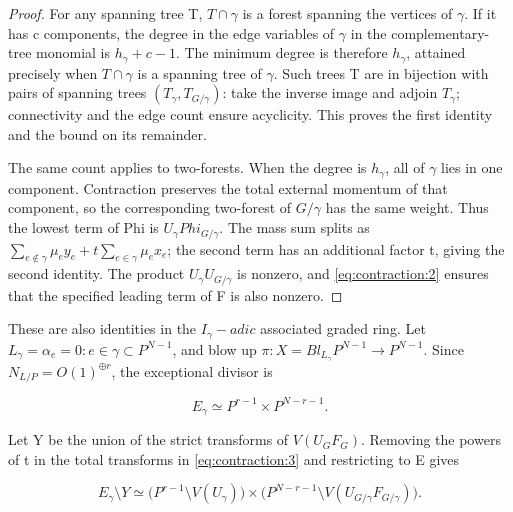 \documentclass[11pt,a4paper,oneside]{article}
\theoremstyle{plain}
\theoremstyle{definition}
\theoremstyle{remark}
\numberwithin{equation}{section}
\begin{document}
\begin{proof}

For any spanning tree T, \(T\cap \gamma \) is a forest spanning the vertices of \(\gamma \). If it has c components, the degree in the edge variables of \(\gamma \) in the complementary-tree monomial is \(h_\gamma +c- 1\). The minimum degree is therefore \(h_\gamma \), attained precisely when \(T\cap \gamma \) is a spanning tree of \(\gamma \). Such trees T are in bijection with pairs of spanning trees \((T_\gamma ,T_{G/\gamma })\): take the inverse image and adjoin \(T_\gamma \); connectivity and the edge count ensure acyclicity. This proves the first identity and the bound on its remainder.

The same count applies to two-forests. When the degree is \(h_\gamma \), all of \(\gamma \) lies in one component. Contraction preserves the total external momentum of that component, so the corresponding two-forest of \(G/\gamma \) has the same weight. Thus the lowest term of Phi is \(U_\gamma  Phi_{G/\gamma }\). The mass sum splits as \(\sum _{e\notin \gamma }\mu _e y_e+t\sum _{e\in \gamma }\mu _e x_e\); the second term has an additional factor t, giving the second identity. The product \(U_\gamma  U_{G/\gamma }\) is nonzero, and \eqref{eq:contraction:2} ensures that the specified leading term of F is also nonzero.

\end{proof}

These are also identities in the \(I_\gamma -adic\) associated graded ring. Let \(L_\gamma ={\alpha _e=0:e\in \gamma }\subset P^{N- 1}\), and blow up \(\pi :X=Bl_{L_\gamma }P^{N- 1}\to P^{N- 1}\). Since \(N_{L/P}=O(1)^{\oplus r}\), the exceptional divisor is

\begin{equation}
E_\gamma\simeq P^{r-1}\times P^{N-r-1}.          \label{eq:contraction:4}
\end{equation}

Let Y be the union of the strict transforms of \(V(U_G F_G)\). Removing the powers of t in the total transforms in \eqref{eq:contraction:3} and restricting to E gives

\begin{equation}
E_\gamma\setminus Y
  \simeq\big(P^{r-1}\setminus V(U_\gamma)\big)
       \times\big(P^{N-r-1}\setminus V(U_{G/\gamma}F_{G/\gamma})\big).
                                                                    \label{eq:contraction:5}
\end{equation}
\end{document}
